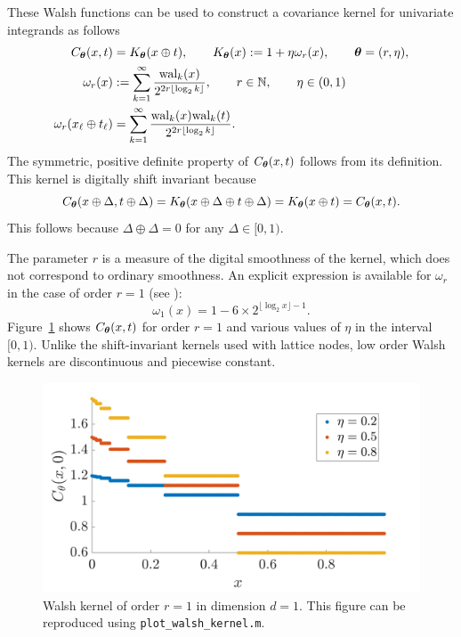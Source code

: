 \documentclass[graybox,footinfo]{svmult}
\newcommand{\JRNote}[1]{{\textcolor{green}{JR: #1}}}
\begin{document}
These Walsh functions can be used to construct a covariance kernel for univariate integrands as follows
\begin{align}
	\label{FJ:eqn:walsh_kernel}
    C_\bstheta (x,t) & = K_\bstheta(x \oplus t), \qquad K_\bstheta(x) : = 1 + \eta \omega_{r} (x), \qquad \bstheta = (r,\eta), \\
    \nonumber
    \omega_r(x) & := \sum_{k=1}^\infty \frac{\textup{wal}_{k}(x) }{2^{2r \lfloor \log_2 k \rfloor}}, \qquad r \in {\N}, \qquad \eta \in (0, 1)\\
    \nonumber
    \omega_{r} (x_\ell \oplus t_\ell) & = \sum_{k=1}^\infty \frac{\textup{wal}_{k}(x) \textup{wal}_{k}(t)  }{2^{2r \lfloor \log_2 k \rfloor}}.
\end{align}
The symmetric, positive definite property of $ C_{\boldsymbol{\theta}} (x,t)$ follows from its definition.  This kernel is digitally shift invariant because 
\[
C_{\boldsymbol{\theta}} (x \oplus \Delta ,t \oplus \Delta ) = K_{\boldsymbol{\theta}}(x \oplus \Delta \oplus t \oplus \Delta) = K_{\boldsymbol{\theta}}(x \oplus t) =  C_{\boldsymbol{\theta}} (x,t).
\]
This follows because $\Delta \oplus \Delta = 0$ for any $\Delta \in [0,1)$.

The parameter $r$ is a measure of the digital smoothness of the kernel, which does not correspond to ordinary smoothness.  An explicit expression is available for $\omega_{r}$ in the case of order $r=1$ (see \cite{Nuyens2013}):
\begin{equation}
\label{FJ:eqn:omega1}
\omega_1(x) 
= 1  - 6 \times 2^{\lfloor \log_2 x \rfloor -1 }.
\end{equation}
Figure~\ref{FJ:fig:walshkernel-dim1} shows $C_{\boldsymbol{\theta}} (x,t)$ for order $r=1$ and various values of $\eta$ in the interval $[0,1)$. Unlike the shift-invariant kernels used with lattice nodes, low order Walsh kernels are discontinuous and piecewise constant. 

\begin{figure}
	\centering
	\includegraphics[width=0.9\linewidth]{"figures/walsh_kernel dim_1"}
	\caption[Walsh kernel]{Walsh kernel of order $r=1$ in dimension $d=1$. This figure can be reproduced using \texttt{plot\_walsh\_kernel.m}. %
	}
	\label{FJ:fig:walshkernel-dim1}
\end{figure}
\end{document}
